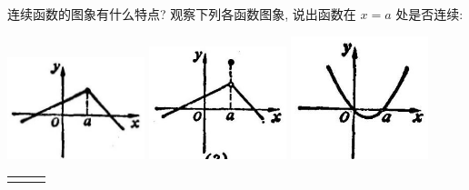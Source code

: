 \documentclass[lang=cn,newtx,12pt,scheme=chinese]{elegantbook}
\begin{document}
\begin{problemset}[练习]

\item 连续函数的图象有什么特点? 观察下列各函数图象, 说出函数在 \(x = a\) 处是否连续:

\begin{center}
	\includegraphics[max width=0.3\textwidth]{images/01912c18-5c3f-733d-b775-749ba9897a9d_35_115885.jpg}
	\includegraphics[max width=0.3\textwidth]{images/01912c18-5c3f-733d-b775-749ba9897a9d_35_560451.jpg}
	\includegraphics[max width=0.3\textwidth]{images/01912c18-5c3f-733d-b775-749ba9897a9d_35_351282.jpg}
\end{center}

\noindent %
\begin{tabular}{ccc}
	\makebox[0.3\textwidth][c]{(1)} &
	\makebox[0.3\textwidth][c]{(2)} &
	\makebox[0.3\textwidth][c]{(3)}
\end{tabular}


\end{problemset}
\end{document}
